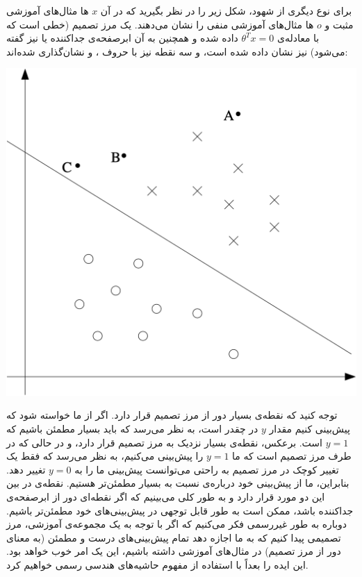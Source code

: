 \documentclass[12pt]{article}
\begin{document}
برای نوع دیگری از شهود، شکل زیر را در نظر بگیرید که در آن
$x$
ها مثال‌های آموزشی مثبت و
$o$
ها مثال‌های آموزشی منفی را نشان می‌دهند. یک مرز تصمیم (خطی است که با معادله‌ی
$\theta^T x = 0$
داده شده و همچنین به آن ابرصفحه‌ی جداکننده یا
نیز گفته می‌شود) نیز نشان داده شده است، و سه نقطه نیز با حروف
،
و
نشان‌گذاری شده‌اند:
\begin{center}
    \includegraphics[scale=0.5]{figs/margin.png}
\end{center}

توجه کنید که نقطه‌ی
بسیار دور از مرز تصمیم قرار دارد. اگر از ما خواسته شود که پیش‌بینی کنیم مقدار
$y$
در
چقدر است، به نظر می‌رسد که باید بسیار مطمئن باشیم که
$y = 1$
است. برعکس، نقطه‌ی
بسیار نزدیک به مرز تصمیم قرار دارد، و در حالی که در طرف مرز تصمیم است که ما
$y = 1$
را پیش‌بینی می‌کنیم، به نظر می‌رسد که فقط یک تغییر کوچک در مرز تصمیم به راحتی می‌توانست پیش‌بینی ما را به
$y = 0$
تغییر دهد. بنابراین، ما از پیش‌بینی خود درباره‌ی
نسبت به
بسیار مطمئن‌تر هستیم. نقطه‌ی
در بین این دو مورد قرار دارد و به طور کلی می‌بینیم که اگر نقطه‌ای دور از ابرصفحه‌ی جداکننده باشد، ممکن است به طور قابل توجهی در پیش‌بینی‌های خود مطمئن‌تر باشیم. دوباره به طور غیررسمی فکر می‌کنیم که اگر با توجه به یک مجموعه‌ی آموزشی، مرز تصمیمی پیدا کنیم که به ما اجازه دهد تمام پیش‌بینی‌های درست و مطمئن (به معنای دور از مرز تصمیم) در مثال‌های آموزشی داشته باشیم، این یک امر خوب خواهد بود. این ایده را بعداً با استفاده از مفهوم حاشیه‌های هندسی رسمی خواهیم کرد.
\end{document}
